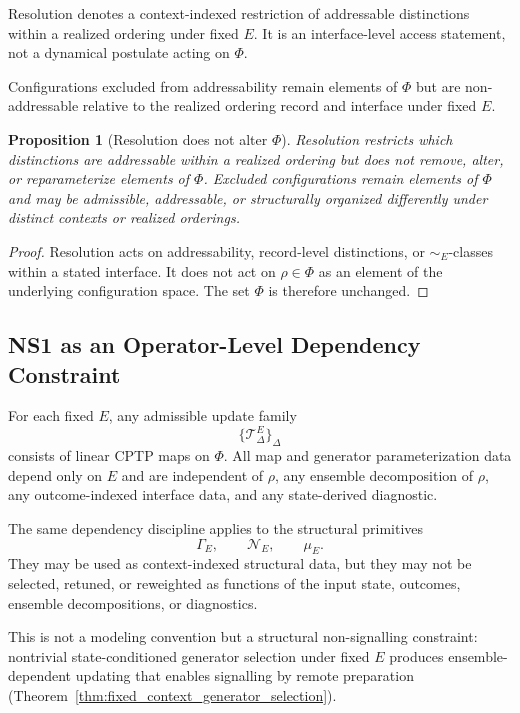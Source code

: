 \documentclass[aps,prx,onecolumn,11pt]{revtex4-2}
\theoremstyle{plain}
\newtheorem{proposition}{Proposition}
\theoremstyle{definition}
\theoremstyle{remark}
\begin{document}
Resolution denotes a context-indexed restriction of addressable
distinctions within a realized ordering under fixed \(E\). It is an
interface-level access statement, not a dynamical postulate acting on
\(\Phi\).

Configurations excluded from addressability remain elements of \(\Phi\)
but are non-addressable relative to the realized ordering record and
interface under fixed \(E\).

\begin{proposition}[Resolution does not alter \(\Phi\)]
\label{prop:resolution_not_destruction}
Resolution restricts which distinctions are addressable within a
realized ordering but does not remove, alter, or reparameterize elements
of \(\Phi\). Excluded configurations remain elements of \(\Phi\) and
may be admissible, addressable, or structurally organized differently
under distinct contexts or realized orderings.
\end{proposition}

\begin{proof}
Resolution acts on addressability, record-level distinctions, or
\(\sim_E\)-classes within a stated interface. It does not act on
\(\rho\in\Phi\) as an element of the underlying configuration space. The
set \(\Phi\) is therefore unchanged.
\end{proof}

\subsection{NS1 as an Operator-Level Dependency Constraint}
\label{subsec:NS1_operator_constraint}

For each fixed \(E\), any admissible update family
\[
\{\mathcal{T}^E_\Delta\}_\Delta
\]
consists of linear CPTP maps on \(\Phi\). All map and generator
parameterization data depend only on \(E\) and are independent of
\(\rho\), any ensemble decomposition of \(\rho\), any outcome-indexed
interface data, and any state-derived diagnostic.

The same dependency discipline applies to the structural primitives
\[
\Gamma_E,
\qquad
\mathcal N_E,
\qquad
\mu_E.
\]
They may be used as context-indexed structural data, but they may not be
selected, retuned, or reweighted as functions of the input state,
outcomes, ensemble decompositions, or diagnostics.

This is not a modeling convention but a structural non-signalling
constraint: nontrivial state-conditioned generator selection under fixed
\(E\) produces ensemble-dependent updating that enables signalling by
remote preparation
(Theorem~\ref{thm:fixed_context_generator_selection}).
\end{document}
